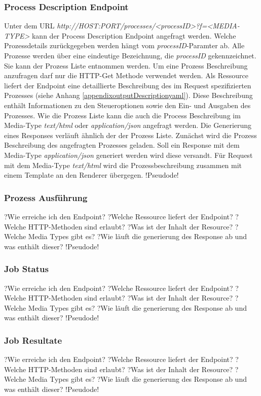\subsubsection{Process Description Endpoint}
Unter dem URL \textit{http://HOST:PORT/processes/<processID>?f=<MEDIA-TYPE>} kann der Process Description Endpoint angefragt werden. Welche Prozessdetails zurückgegeben werden hängt vom \textit{processID}-Paramter ab. Alle Prozesse werden über eine 
eindeutige Bezeichnung, die \textit{processID} gekennzeichnet. Sie kann der Prozess Liste entnommen werden. Um eine Prozess Beschreibung anzufragen darf nur die HTTP-Get Methode verwendet werden.   
Als Ressource liefert der Endpoint eine detaillierte Beschreibung des im Request spezifizierten Prozesses (siehe Anhang \ref{appendixoutputDescriptionyaml}). Diese Beschreibung enthält Informationen zu den Steueroptionen sowie den Ein- und Ausgaben des Prozesses.
Wie die Prozess Liste kann die auch die Process Beschreibung im Media-Type \textit{text/html} oder \textit{application/json} angefragt werden. 
Die Generierung eines Responses verläuft ähnlich der der Prozess Liste. Zunächst wird die Prozess Beschreibung des angefragten Prozesses geladen. Soll ein Response mit dem Media-Type \textit{application/json} generiert werden wird diese versandt. 
Für Request mit dem Media-Type \textit{text/html} wird die Prozessbeschreibung zusammen mit einem Template an den Renderer übergegen. 
!Pseudode!
\subsubsection{Prozess Ausführung}
?Wie erreiche ich den Endpoint?
?Welche Ressource liefert der Endpoint?
?Welche HTTP-Methoden sind erlaubt?
?Was ist der Inhalt der Resource?
?Welche Media Types gibt es?
?Wie läuft die generierung des Response ab und was enthält dieser?
!Pseudode!
\subsubsection{Job Status}?Wie erreiche ich den Endpoint?
?Welche Ressource liefert der Endpoint?
?Welche HTTP-Methoden sind erlaubt?
?Was ist der Inhalt der Resource?
?Welche Media Types gibt es?
?Wie läuft die generierung des Response ab und was enthält dieser?
!Pseudode!
\subsubsection{Job Resultate}
?Wie erreiche ich den Endpoint?
?Welche Ressource liefert der Endpoint?
?Welche HTTP-Methoden sind erlaubt?
?Was ist der Inhalt der Resource?
?Welche Media Types gibt es?
?Wie läuft die generierung des Response ab und was enthält dieser?
!Pseudode!
